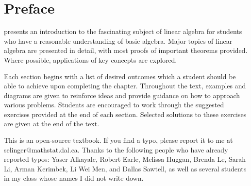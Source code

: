 \chapter*{Preface}

\textit{\bookfulltitle} presents an introduction to the fascinating
subject of linear algebra for students who have a reasonable
understanding of basic algebra. Major topics of linear algebra are
presented in detail, with most proofs of important theorems
provided. Where possible, applications of key concepts are explored.

Each section begins with a list of desired outcomes which a student
should be able to achieve upon completing the chapter.  Throughout the
text, examples and diagrams are given to reinforce ideas and provide
guidance on how to approach various problems. Students are encouraged
to work through the suggested exercises provided at the end of each
section. Selected solutions to these exercises are given at the end of
the text.

This is an open-source textbook. If you find a typo, please report it
to me at selinger@mathstat.dal.ca. Thanks to the following people who
have already reported typos: Yaser Alkayale, Robert Earle, Melissa
Huggan, Brenda Le, Sarah Li, Arman Kerimbek, Li Wei Men, and Dallas
Sawtell, as well as several students in my class whose names I did not
write down.
